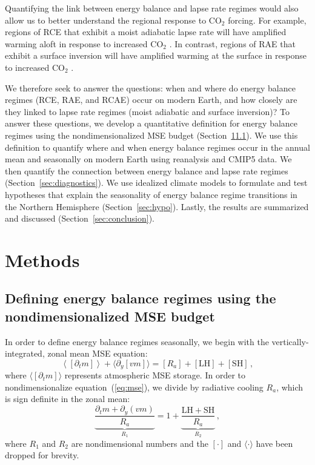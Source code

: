 \documentclass{ametsocV5}
\begin{document}
Quantifying the link between energy balance and lapse rate regimes would also allow us to better understand the regional response to CO$_2$ forcing. For example, regions of RCE that exhibit a moist adiabatic lapse rate will have amplified warming aloft in response to increased CO$_2$ \citep{held1993, romps2011}. In contrast, regions of RAE that exhibit a surface inversion will have amplified warming at the surface in response to increased CO$_2$ \citep{held1993, cronin2016}.

We therefore seek to answer the questions: when and where do energy balance regimes (RCE, RAE, and RCAE) occur on modern Earth, and how closely are they linked to lapse rate regimes (moist adiabatic and surface inversion)? To answer these questions, we develop a quantitative definition for energy balance regimes using the nondimensionalized MSE budget (Section~\ref{sec:methods}\ref{subsec:mse}). We use this definition to quantify where and when energy balance regimes occur in the annual mean and seasonally on modern Earth using reanalysis and CMIP5 data. We then quantify the connection between energy balance and lapse rate regimes (Section~\ref{sec:diagnostics}). We use idealized climate models to formulate and test hypotheses that explain the seasonality of energy balance regime transitions in the Northern Hemisphere (Section~\ref{sec:hypo}). Lastly, the results are summarized and discussed (Section~\ref{sec:conclusion}).

\section{Methods}\label{sec:methods}
    \subsection{Defining energy balance regimes using the nondimensionalized MSE budget} \label{subsec:mse}
    In order to define energy balance regimes seasonally, we begin with the vertically-integrated, zonal mean MSE equation:
    \begin{equation} \label{eq:mse}
        \left\langle\left[\partial_t m\right]\right\rangle + \langle\partial_y [vm]\rangle = [R_{a}] + \mathrm{[LH]+[SH]} \, ,
    \end{equation}
    where $\langle[\partial_t m]\rangle$ represents atmospheric MSE storage. In order to nondimensionalize equation~(\ref{eq:mse}), we divide by radiative cooling $R_a$, which is sign definite in the zonal mean:
    \begin{equation}
        {\underbrace{\frac{\partial_t m + \partial_y (vm)}{R_{a}}}_{R_1}} = 1 + {\underbrace{\frac{\mathrm{LH+SH}}{R_{a}}}_{R_2}} \, ,
    \end{equation}
    where $R_1$ and $R_2$ are nondimensional numbers and the $[\cdot]$ and $\langle\cdot\rangle$ have been dropped for brevity. 
\end{document}
